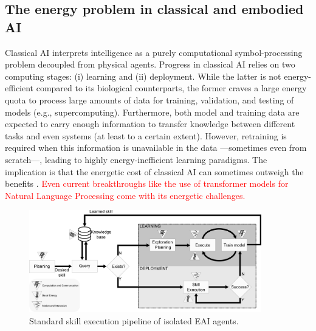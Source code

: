 \subsection{The energy problem in classical and embodied AI}
Classical AI interprets intelligence as a purely computational symbol-processing problem decoupled from physical agents. Progress in classical AI relies on two computing stages: (i) learning and (ii) deployment. While the latter is not energy-efficient compared to its biological counterparts, the former craves a large energy quota to process large amounts of data for training, validation, and testing of models (e.g., supercomputing). Furthermore, both model and training data are expected to carry enough information to transfer knowledge between different tasks and even systems (at least to a certain extent). However, retraining is required when this information is unavailable in the data ---sometimes even from scratch---, leading to highly energy-inefficient learning paradigms. The implication is that the energetic cost of classical AI can sometimes outweigh the benefits \cite{Strubell2019EnergyAP}. \textcolor{red}{Even current breakthroughs like the use of transformer models for Natural Language Processing come with its energetic challenges\cite{Cao2020TowardsAccurateReliable}.}
\begin{figure}[!ht]
	\centering
	\includegraphics[width=0.9\textwidth]{fig/embodied_ai_learning_pipeline_v7.png}
	\caption{Standard skill execution pipeline of isolated EAI agents.}
	\label{fig:embodied_ai_pipeline}
\end{figure}
